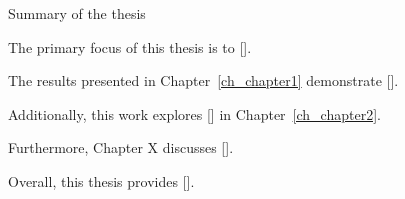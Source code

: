 Summary of the thesis

The primary focus of this thesis is to [].

The results presented in Chapter~\ref{ch_chapter1} demonstrate []. 

Additionally, this work explores [] in Chapter~\ref{ch_chapter2}. 

Furthermore, Chapter X discusses [].  

Overall, this thesis provides [].